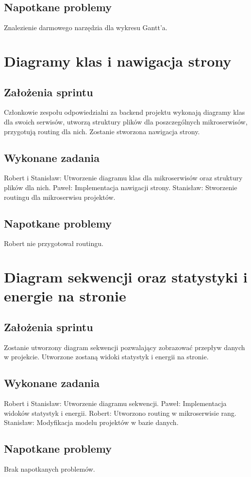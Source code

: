 \documentclass[a4paper,11pt]{report}
\begin{document}
\subsection {Napotkane problemy}
Znalezienie darmowego narzędzia dla wykresu Gantt'a.

\section {Diagramy klas i nawigacja strony}
\subsection {Założenia sprintu}
Członkowie zespołu odpowiedzialni za backend projektu wykonają diagramy klas dla swoich serwisów, utworzą struktury plików dla poszczególnych mikroserwisów, przygotują routing dla nich. Zostanie stworzona nawigacja strony.
\subsection {Wykonane zadania}
Robert i Stanisław: Utworzenie diagramu klas dla mikroserwisów oraz struktury plików dla nich.
Paweł: Implementacja nawigacji strony. 
Stanisław: Stworzenie routingu dla mikroserwisu projektów.
\subsection {Napotkane problemy}
Robert nie przygotował routingu.

\section {Diagram sekwencji oraz statystyki i energie na stronie}
\subsection {Założenia sprintu}
Zostanie utworzony diagram sekwencji pozwalający zobrazować przepływ danych w projekcie. Utworzone zostaną widoki statystyk i energii na stronie.
\subsection {Wykonane zadania}
Robert i Stanisław: Utworzenie diagramu sekwencji.
Paweł: Implementacja widoków statystyk i energii. 
Robert: Utworzono routing w mikroserwisie rang.
Stanisław: Modyfikacja modelu projektów w bazie danych.
\subsection {Napotkane problemy}
Brak napotkanych problemów.
\end{document}
